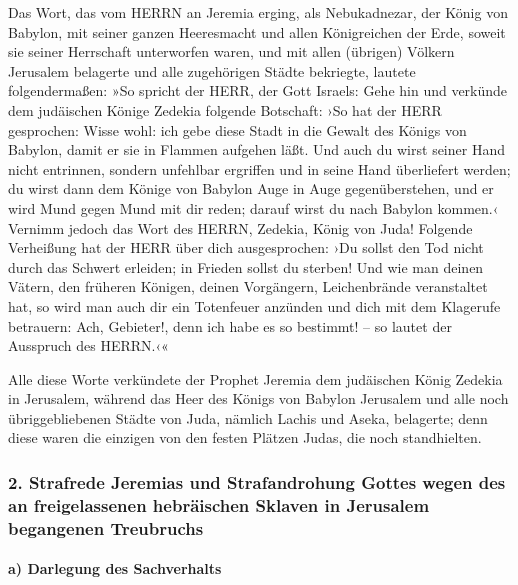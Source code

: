 Das Wort, das vom HERRN an Jeremia erging, als
Nebukadnezar, der König von Babylon, mit seiner ganzen Heeresmacht und
allen Königreichen der Erde, soweit sie seiner Herrschaft unterworfen
waren, und mit allen (übrigen) Völkern Jerusalem belagerte und alle
zugehörigen Städte bekriegte, lautete folgendermaßen: »So
spricht der HERR, der Gott Israels: Gehe hin und verkünde dem judäischen
Könige Zedekia folgende Botschaft: ›So hat der HERR gesprochen: Wisse
wohl: ich gebe diese Stadt in die Gewalt des Königs von Babylon, damit
er sie in Flammen aufgehen läßt. Und auch du wirst seiner
Hand nicht entrinnen, sondern unfehlbar ergriffen und in seine Hand
überliefert werden; du wirst dann dem Könige von Babylon Auge in Auge
gegenüberstehen, und er wird Mund gegen Mund mit dir reden; darauf wirst
du nach Babylon kommen.‹ Vernimm jedoch das Wort des
HERRN, Zedekia, König von Juda! Folgende Verheißung hat der HERR über
dich ausgesprochen: ›Du sollst den Tod nicht durch das Schwert erleiden;
in Frieden sollst du sterben! Und wie man deinen Vätern,
den früheren Königen, deinen Vorgängern, Leichenbrände veranstaltet hat,
so wird man auch dir ein Totenfeuer anzünden und dich mit dem Klagerufe
betrauern: Ach, Gebieter!, denn ich habe es so bestimmt! -- so lautet
der Ausspruch des HERRN.‹«

Alle diese Worte verkündete der Prophet Jeremia dem
judäischen König Zedekia in Jerusalem, während das Heer
des Königs von Babylon Jerusalem und alle noch übriggebliebenen Städte
von Juda, nämlich Lachis und Aseka, belagerte; denn diese waren die
einzigen von den festen Plätzen Judas, die noch standhielten.

\hypertarget{strafrede-jeremias-und-strafandrohung-gottes-wegen-des-an-freigelassenen-hebruxe4ischen-sklaven-in-jerusalem-begangenen-treubruchs}{%
\subsubsection{2. Strafrede Jeremias und Strafandrohung Gottes wegen des
an freigelassenen hebräischen Sklaven in Jerusalem begangenen
Treubruchs}\label{strafrede-jeremias-und-strafandrohung-gottes-wegen-des-an-freigelassenen-hebruxe4ischen-sklaven-in-jerusalem-begangenen-treubruchs}}

\hypertarget{a-darlegung-des-sachverhalts}{%
\paragraph{a) Darlegung des
Sachverhalts}\label{a-darlegung-des-sachverhalts}}

